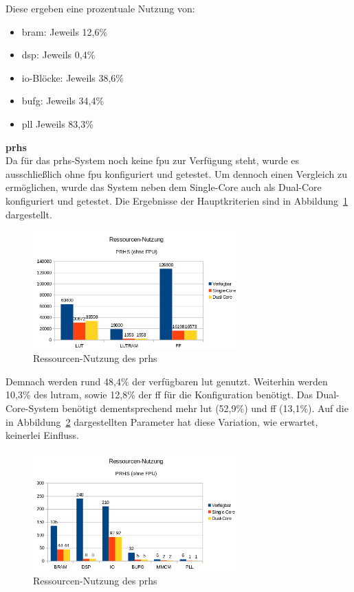 Diese ergeben eine prozentuale Nutzung von:\\
\begin{itemize}
  \item \ac{bram}: Jeweils 12,6\%
  \item \ac{dsp}: Jeweils 0,4\%
  \item \ac{io}-Blöcke: Jeweils 38,6\%
  \item \ac{bufg}: Jeweils 34,4\%
  \item \ac{pll} Jeweils 83,3\%
\end{itemize}


\textbf{\acl{prhs}}\\

Da für das \ac{prhs}-System noch keine \ac{fpu} zur Verfügung steht, wurde es ausschließlich ohne \ac{fpu} konfiguriert und getestet.
Um dennoch einen Vergleich zu ermöglichen, wurde das System neben dem Single-Core auch als Dual-Core konfiguriert und getestet.
Die Ergebnisse der Hauptkriterien sind in Abbildung~\ref{fig:ressourcenprhs1} dargestellt.\\

\begin{figure}[H]
\centering
\includegraphics[width=0.7\textwidth]{Hauptteil/ressourcenprhs1.png}
\caption{Ressourcen-Nutzung des \ac{prhs}}
\label{fig:ressourcenprhs1}
\end{figure}

Demnach werden rund 48,4\% der verfügbaren \ac{lut} genutzt. Weiterhin werden 10,3\% des \ac{lutram}, sowie 12,8\% der \ac{ff} für die Konfiguration benötigt. Das Dual-Core-System benötigt
dementsprechend mehr \ac{lut} (52,9\%) und \ac{ff} (13,1\%). Auf die in Abbildung~\ref{fig:ressourcenprhs2} dargestellten Parameter hat diese Variation, wie erwartet, keinerlei Einfluss.\\

\begin{figure}[H]
\centering
\includegraphics[width=0.7\textwidth]{Hauptteil/ressourcenprhs2.png}
\caption{Ressourcen-Nutzung des \ac{prhs}}
\label{fig:ressourcenprhs2}
\end{figure}


